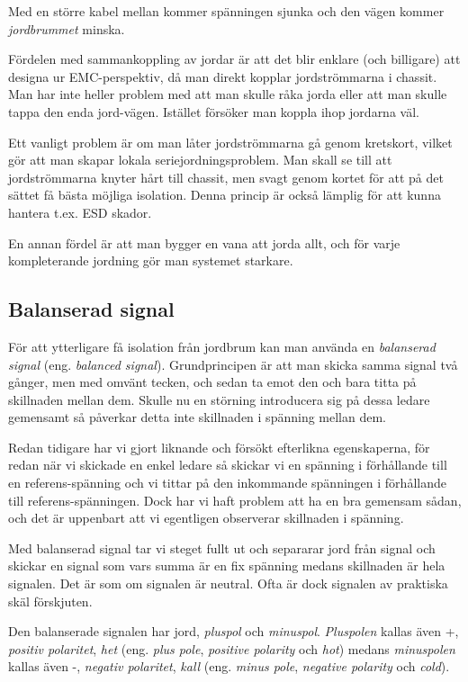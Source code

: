 Med en större kabel mellan kommer spänningen sjunka och den vägen kommer
\emph{jordbrummet} minska.

Fördelen med sammankoppling av jordar är att det blir enklare (och billigare)
att designa ur EMC-perspektiv, då man direkt kopplar jordströmmarna i chassit.
Man har inte heller problem med att man skulle råka jorda eller att man skulle
tappa den enda jord-vägen. Istället försöker man koppla ihop jordarna väl.

Ett vanligt problem är om man låter jordströmmarna gå genom kretskort, vilket
gör att man skapar lokala seriejordningsproblem. Man skall se till att
jordströmmarna knyter hårt till chassit, men svagt genom kortet för att på det
sättet få bästa möjliga isolation. Denna princip är också lämplig för att
kunna hantera t.ex. ESD skador.

En annan fördel är att man bygger en vana att jorda allt, och för varje
kompleterande jordning gör man systemet starkare.

\subsection{Balanserad signal}

För att ytterligare få isolation från jordbrum kan man använda en
\emph{balanserad signal} (eng. \emph{balanced signal}). Grundprincipen är att
man skicka samma signal två gånger, men med omvänt tecken, och sedan ta emot
den och bara titta på skillnaden mellan dem. Skulle nu en störning introducera
sig på dessa ledare gemensamt så påverkar detta inte skillnaden i spänning
mellan dem.

Redan tidigare har vi gjort liknande och försökt efterlikna
egenskaperna, för redan när vi skickade en enkel ledare så skickar vi en
spänning i förhållande till en referens-spänning och vi tittar på den
inkommande spänningen i förhållande till referens-spänningen. Dock har vi haft
problem att ha en bra gemensam sådan, och det är uppenbart att vi egentligen
observerar skillnaden i spänning.

Med balanserad signal tar vi steget fullt ut och separarar jord från signal
och skickar en signal som vars summa är en fix spänning medans skillnaden är
hela signalen. Det är som om signalen är neutral. Ofta är dock signalen av
praktiska skäl förskjuten.

Den balanserade signalen har jord, \emph{pluspol} och \emph{minuspol}.
\emph{Pluspolen} kallas även +, \emph{positiv polaritet}, \emph{het} (eng.
\emph{plus pole}, \emph{positive polarity} och \emph{hot}) medans
\emph{minuspolen} kallas även -, \emph{negativ polaritet}, \emph{kall} (eng.
\emph{minus pole}, \emph{negative polarity} och \emph{cold}).

